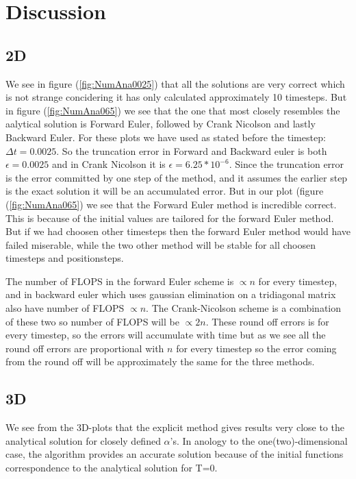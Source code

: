 \documentclass[a4paper,10pt]{article}
\begin{document}
\section{Discussion}
\subsection{2D}
We see in figure (\ref{fig:NumAna0025}) that all the solutions are very correct which is not strange concidering it has only calculated approximately 10 timesteps.
But in figure (\ref{fig:NumAna065}) we see that the one that most closely resembles the aalytical solution is Forward Euler, followed by Crank Nicolson and lastly Backward Euler. 
For these plots we have used as stated before the timestep: $\Delta t = 0.0025$.
So the truncation error in Forward and Backward euler is both $\epsilon = 0.0025$ and in Crank Nicolson it is $\epsilon = 6.25*10^{-6}$. 
Since the truncation error is the error committed by one step of the method, and it assumes the earlier step is the exact solution it will be an accumulated error.
But in our plot (figure (\ref{fig:NumAna065}) we see that the Forward Euler method is incredible correct. This is because of the initial values are 
tailored for the forward Euler method. But if we had choosen other timesteps then the forward Euler method would have failed miserable, while the
two other method will be stable for all choosen timesteps and positionsteps. 

The number of FLOPS in the forward Euler scheme is $\propto n$ for every timestep, and in backward euler which uses gaussian elimination on a tridiagonal matrix also have number of FLOPS
$\propto n$. The Crank-Nicolson scheme is a combination of these two so number of FLOPS will be $\propto 2n$. These round off errors is for every timestep, so the
errors will accumulate with time but as we see all the round off errors are proportional with $n$ for every timestep so the error coming from the round
off will be approximately the same for the three methods.

\subsection{3D}
We see from the 3D-plots that the explicit method gives results very close to the analytical solution for closely defined $\alpha$'s. In anology to the one(two)-dimensional case, the algorithm provides an accurate solution because of the initial functions correspondence to the analytical solution for T=0. 
\end{document}
